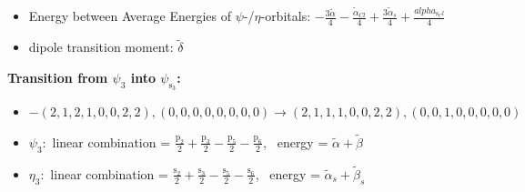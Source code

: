 \documentclass[12pt,a4paper]{article}
\begin{document}
\begin{itemize}
                \item Energy between Average Energies of $\psi$-/$\eta$-orbitals: $- \frac{3 \tilde{\alpha}}{4} - \frac{\tilde{\alpha}_{Cl}}{4} + \frac{3 \tilde{\alpha}_{s}}{4} + \frac{alpha_{\text{s}_Cl}}{4}$
            
            \item dipole transition moment: $\tilde{\delta}$
        
        \end{itemize}
        

        \noindent\textbf{Transition from $\psi_{3}$ into $\psi_{\text{s}_{3}}$:}
        \begin{itemize}
            \item $- (2, 1, 2, 1, 0, 0, 2, 2), (0, 0, 0, 0, 0, 0, 0, 0) \rightarrow (2, 1, 1, 1, 0, 0, 2, 2), (0, 0, 1, 0, 0, 0, 0, 0)$
        
            \item $\psi_{3}:$ linear combination = $\frac{\text{p}_{2}}{2} + \frac{\text{p}_{3}}{2} - \frac{\text{p}_{5}}{2} - \frac{\text{p}_{6}}{2}$, \
            energy = $\tilde{\alpha} + \tilde{\beta}$
            
            \item $\eta_{3}:$ linear combination = $\frac{\text{s}_{2}}{2} + \frac{\text{s}_{3}}{2} - \frac{\text{s}_{5}}{2} - \frac{\text{s}_{6}}{2}$, \
            energy = $\tilde{\alpha}_{s} + \tilde{\beta}_{s}$
            

\end{itemize}
\end{document}
